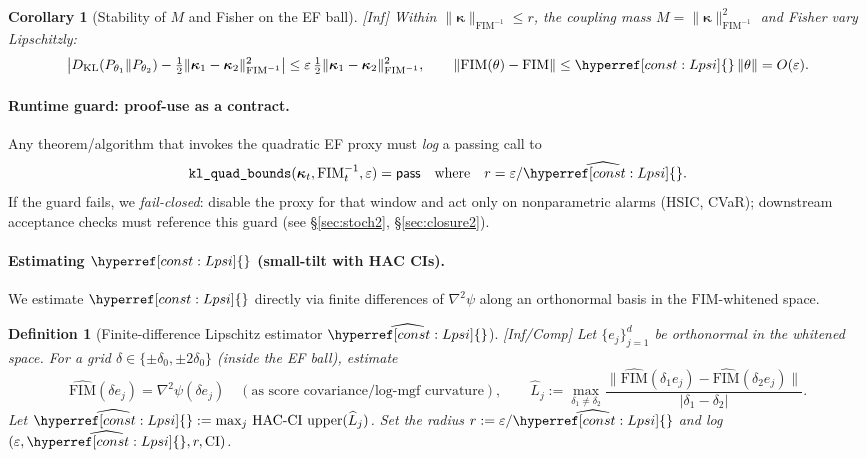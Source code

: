 \documentclass[10pt]{article}
\newcommand{\FIM}{\mathrm{FIM}}
\newcommand{\layertag}[1]{\textup{[#1]}}
\newcommand{\constref}[1]{\hyperref[const:#1]{\ensuremath{\csname constsym#1\endcsname}}}
\newtheorem{definition}{Definition}
\newtheorem{corollary}{Corollary}
\begin{document}
\begin{corollary}[Stability of $M$ and Fisher on the EF ball]\label{cor:radius-stability}
\emph{\layertag{Inf}}
Within $\|\bm\kappa\|_{\FIM^{-1}}\le r$, the coupling mass $M=\|\bm\kappa\|_{\FIM^{-1}}^{2}$ and Fisher vary Lipschitzly:
\[
\big|D_{\mathrm{KL}}(P_{\theta_1}\|P_{\theta_2})-\tfrac12\|\bm\kappa_1-\bm\kappa_2\|_{\FIM^{-1}}^2\big|
\le \varepsilon\,\tfrac12\|\bm\kappa_1-\bm\kappa_2\|_{\FIM^{-1}}^2,\qquad
\|\FIM(\theta)-\FIM\|\le \constref{Lpsi}\,\|\theta\|=O(\varepsilon).
\]
\end{corollary}

\paragraph{Runtime guard: proof-use as a contract.}
Any theorem/algorithm that invokes the quadratic EF proxy must \emph{log} a passing call to
\[
\texttt{kl\_quad\_bounds}(\bm\kappa_t,\FIM_t^{-1},\varepsilon)=\textsf{pass}
\quad\text{where}\quad r=\varepsilon/\widehat{\constref{Lpsi}}.
\]
If the guard fails, we \emph{fail-closed}: disable the proxy for that window and act only on nonparametric alarms (HSIC, CVaR); downstream acceptance checks must reference this guard (see \S\ref{sec:stoch2}, \S\ref{sec:closure2}).

\paragraph{Estimating $\constref{Lpsi}$ (small-tilt with HAC CIs).}
We estimate $\constref{Lpsi}$ directly via finite differences of $\nabla^2\psi$ along an orthonormal basis in the $\FIM$-whitened space.

\begin{definition}[Finite-difference Lipschitz estimator $\widehat{\constref{Lpsi}}$]\label{def:Lpsi-est}
\emph{\layertag{Inf/Comp}}
Let $\{e_j\}_{j=1}^d$ be orthonormal in the whitened space. For a grid $\delta\in\{\pm\delta_0,\pm2\delta_0\}$ (inside the EF ball), estimate
\[
\widehat{\FIM}(\delta e_j)=\nabla^2\psi(\delta e_j)\quad(\text{as score covariance/log-mgf curvature}),
\qquad
\widehat{L}_j:=\max_{\delta_1\neq\delta_2}\frac{\|\widehat{\FIM}(\delta_1 e_j)-\widehat{\FIM}(\delta_2 e_j)\|}{|\delta_1-\delta_2|}.
\]
Let $\widehat{\constref{Lpsi}}:=\max_j\,\mathrm{HAC\text{-}CI\ upper}(\widehat{L}_j)$.
Set the radius $r:=\varepsilon/\widehat{\constref{Lpsi}}$ and \emph{log} $(\varepsilon,\widehat{\constref{Lpsi}},r,\text{CI})$.
\end{definition}
\end{document}
